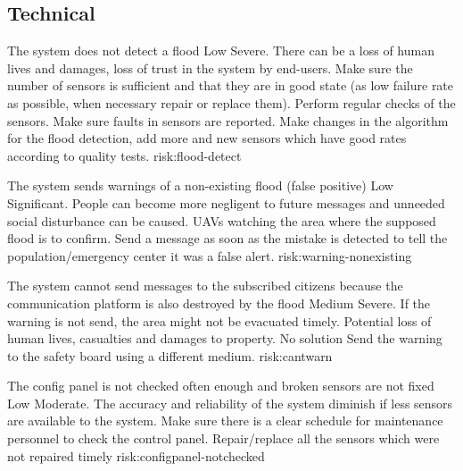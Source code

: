 

\subsection{Technical}

{The system does not detect a flood}
{Low}
{Severe. There can be a loss of human lives and damages, loss of trust in the system by end-users.}
{Make sure the number of sensors is sufficient and that they are in good state (as low failure rate as possible, when necessary repair or replace them). Perform regular checks of the sensors. Make sure faults in sensors are reported. }
{Make changes in the algorithm for the flood detection, add more and new sensors which have good rates according to quality tests.}
{risk:flood-detect}

{The system sends warnings of a non-existing flood (false positive)} %
{Low}
{Significant. People can become more negligent to future messages and unneeded social disturbance can be caused.}
{UAVs watching the area where the supposed flood is to confirm.}
{Send a message as soon as the mistake is detected to tell the population/emergency center it was a false alert. }
{risk:warning-nonexisting}

{The system cannot send messages to the subscribed citizens because the communication platform is also destroyed by the flood}
{Medium}
{Severe. If the warning is not send, the area might not be evacuated timely. Potential loss of human lives, casualties and damages to property. }
{No solution}
{Send the warning to the safety board using a different medium.}
{risk:cantwarn}
	
{The config panel is not checked often enough and broken sensors are not fixed}
{Low}
{Moderate. The accuracy and reliability of the system diminish if less sensors are available to the system.}
{Make sure there is a clear schedule for maintenance personnel to check the control panel.}
{Repair/replace all the sensors which were not repaired timely}
{risk:configpanel-notchecked}
	
